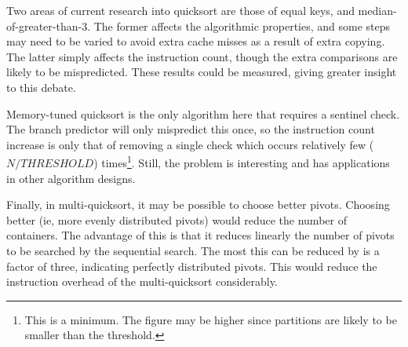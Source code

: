 Two areas of current research into quicksort are those of equal keys, and
median-of-greater-than-3. The former affects the algorithmic properties, and
some steps may need to be varied to avoid extra cache misses as a result
of extra copying. The latter simply affects the instruction count, though the
extra comparisons are likely to be mispredicted. These results could be
measured, giving greater insight to this debate.

Memory-tuned quicksort is the only algorithm here that requires a sentinel
check. The branch predictor will only mispredict this once, so the instruction
count increase is only that of removing a single check which occurs relatively
few ($N / THRESHOLD$) times\footnote{This is a minimum. The figure may be higher
since partitions are likely to be smaller than the threshold.}. Still, the
problem is interesting and has applications in other algorithm designs.

Finally, in multi-quicksort, it may be possible to choose better pivots.
Choosing better (ie, more evenly distributed pivots) would reduce the number of
containers. The advantage of this is that it reduces linearly the number of
pivots to be searched by the sequential search. The most this can be reduced by
is a factor of three, indicating perfectly distributed pivots. This would reduce
the instruction overhead of the multi-quicksort considerably.
